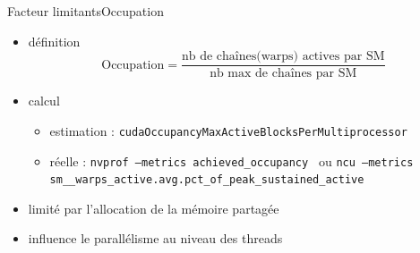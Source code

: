 \documentclass[11pt,mathserif]{beamer}
\begin{document}
\begin{frame}{Facteur limitants}{Occupation}
  \begin{itemize} 
    \item définition 
      $$ \mbox{Occupation} = \frac{\mbox{nb de chaînes(warps) actives par SM}}{\mbox{nb max de chaînes par SM}} $$
    \item calcul 
      \begin{itemize}
        \item estimation : {\tt cudaOccupancyMaxActiveBlocksPerMultiprocessor }
        \item réelle : {\tt nvprof --metrics achieved\_occupancy } ou {\tt ncu --metrics  sm\_\_warps\_active.avg.pct\_of\_peak\_sustained\_active}
      \end{itemize}
    \item limité par l'allocation de la mémoire partagée
    \item influence le parallélisme au niveau des threads
  \end{itemize}
\end{frame}
\end{document}
